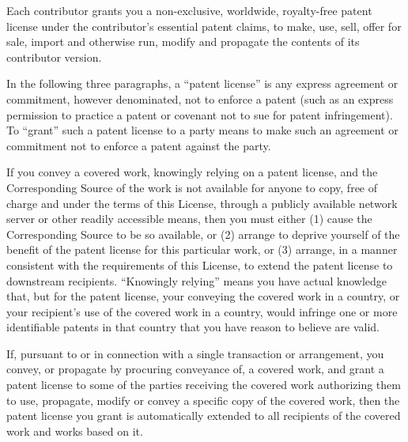 \begin{enumerate}
        Each contributor grants you a non-exclusive, worldwide, royalty-free
        patent license under the contributor's essential patent claims, to
        make, use, sell, offer for sale, import and otherwise run, modify and
        propagate the contents of its contributor version.

        In the following three paragraphs, a ``patent license'' is any express
        agreement or commitment, however denominated, not to enforce a patent
        (such as an express permission to practice a patent or covenant not to
        sue for patent infringement).  To ``grant'' such a patent license to a
        party means to make such an agreement or commitment not to enforce a
        patent against the party.

        If you convey a covered work, knowingly relying on a patent license,
        and the Corresponding Source of the work is not available for anyone
        to copy, free of charge and under the terms of this License, through a
        publicly available network server or other readily accessible means,
        then you must either (1) cause the Corresponding Source to be so
        available, or (2) arrange to deprive yourself of the benefit of the
        patent license for this particular work, or (3) arrange, in a manner
        consistent with the requirements of this License, to extend the patent
        license to downstream recipients.  ``Knowingly relying'' means you have
        actual knowledge that, but for the patent license, your conveying the
        covered work in a country, or your recipient's use of the covered work
        in a country, would infringe one or more identifiable patents in that
        country that you have reason to believe are valid.

        If, pursuant to or in connection with a single transaction or
        arrangement, you convey, or propagate by procuring conveyance of, a
        covered work, and grant a patent license to some of the parties
        receiving the covered work authorizing them to use, propagate, modify
        or convey a specific copy of the covered work, then the patent license
        you grant is automatically extended to all recipients of the covered
        work and works based on it.


\end{enumerate}
